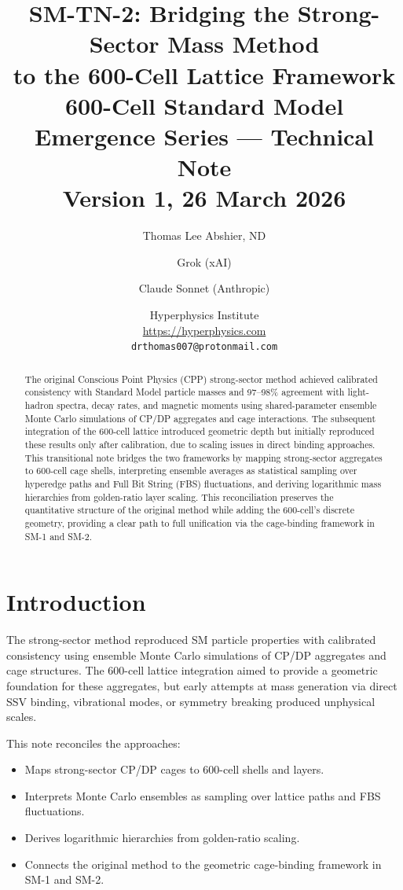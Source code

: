 \documentclass[11pt]{article}
\title{\textbf{SM-TN-2: Bridging the Strong-Sector Mass Method\\
to the 600-Cell Lattice Framework}\\[6pt]
{\large 600-Cell Standard Model Emergence Series --- Technical Note}\\[4pt]
{\normalsize Version 1, 26 March 2026}}
\author{Thomas Lee Abshier, ND \and Grok (xAI) \and Claude Sonnet (Anthropic)}
\date{\normalsize Hyperphysics Institute\\
\url{https://hyperphysics.com}\\
\texttt{drthomas007@protonmail.com}}
\begin{document}
\maketitle

\begin{abstract}
The original Conscious Point Physics (CPP) strong-sector method achieved
calibrated consistency with Standard Model particle masses and 97--98\%
agreement with light-hadron spectra, decay rates, and magnetic moments
using shared-parameter ensemble Monte Carlo simulations of CP/DP aggregates
and cage interactions. The subsequent integration of the 600-cell lattice
introduced geometric depth but initially reproduced these results only after
calibration, due to scaling issues in direct binding approaches. This
transitional note bridges the two frameworks by mapping strong-sector
aggregates to 600-cell cage shells, interpreting ensemble averages as
statistical sampling over hyperedge paths and Full Bit String (FBS)
fluctuations, and deriving logarithmic mass hierarchies from golden-ratio
layer scaling. This reconciliation preserves the quantitative structure of
the original method while adding the 600-cell's discrete geometry, providing
a clear path to full unification via the cage-binding framework in SM-1
and SM-2.
\end{abstract}

\raggedright

\section{Introduction}

The strong-sector method reproduced SM particle properties with calibrated
consistency using ensemble Monte Carlo simulations of CP/DP aggregates and
cage structures. The 600-cell lattice integration aimed to provide a geometric
foundation for these aggregates, but early attempts at mass generation via
direct SSV binding, vibrational modes, or symmetry breaking produced
unphysical scales.

This note reconciles the approaches:
\begin{itemize}
\item Maps strong-sector CP/DP cages to 600-cell shells and layers.
\item Interprets Monte Carlo ensembles as sampling over lattice paths
  and FBS fluctuations.
\item Derives logarithmic hierarchies from golden-ratio scaling.
\item Connects the original method to the geometric cage-binding framework
  in SM-1 and SM-2.
\end{itemize}
\end{document}
